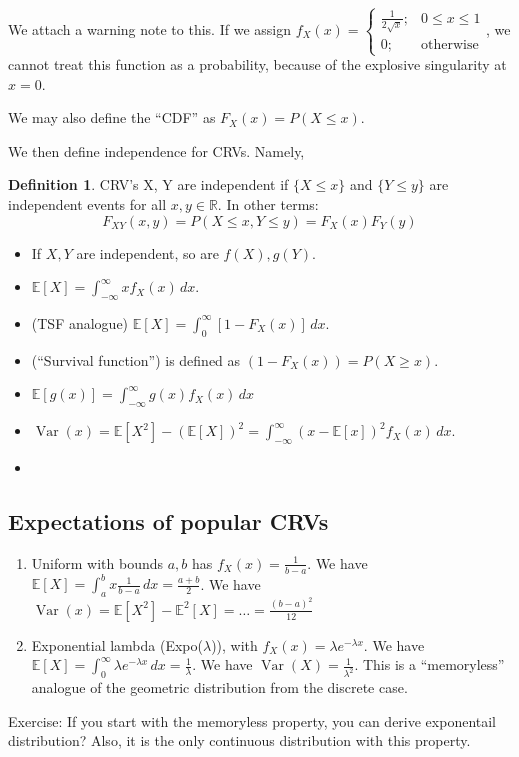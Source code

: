 \documentclass{article}
\newcommand{\R}{\mathbb R}
\newcommand{\E}{\mathbb E}
\DeclareMathOperator{\Var}{Var}
\theoremstyle{remark}
\theoremstyle{definition}
\newtheorem{definition}{Definition}[section]
\begin{document}
We attach a warning note to this.
If we assign $f_X(x) = \begin{cases}
    \frac{1}{2\sqrt x}; & 0\leq x \leq 1 \\
    0; &\text{otherwise}
\end{cases}$, 
we cannot treat this function as a probability, because of the explosive singularity at $x = 0$.

We may also define the ``CDF'' as $F_X(x) = P(X \leq x)$.

We then define independence for CRVs.
Namely,
\begin{definition}
    CRV's X, Y are independent if $\{X \leq x\}$ and $\{Y \leq y\}$ are independent events for all $x, y\in \R$.
    In other terms:
    \begin{equation*}
        F_{XY}(x, y) = P(X \leq x, Y \leq y) = F_X(x) F_Y(y) 
    \end{equation*}
\end{definition}
\begin{itemize}
    \item If $X,Y$ are independent, so are $f(X), g(Y)$.
    \item $\E[X] = \int_{-\infty}^{\infty} xf_X(x)\, dx$. 
    \item (TSF analogue) $\E[X] = \int_0^\infty[1 - F_X(x)]\, dx$.
    \item (``Survival function'') is defined as $(1 - F_X(x)) = P(X \geq x)$.
    \item $\E[g(x)] = \int_{-\infty}^\infty g(x) f_X(x) \, dx$ 
    \item $\Var(x) = \E[X^2] - (\E[X])^2 = \int_{-\infty}^\infty (x - \E[x])^2 f_X(x) \, dx$.
    \item %
\end{itemize}

\subsection*{Expectations of popular CRVs}
\begin{enumerate}
    \item Uniform with bounds $a, b$ has $f_X(x) = \frac{1}{b-a}$. 
    We have $\E[X] = \int_a^b x\frac{1}{b-a}\, dx = \frac{a+b}2$.
    We have $\Var(x) = \E[X^2] - \E^2[X] = \dots = \frac{(b-a)^2}{12}$
    \item Exponential lambda (Expo($\lambda$)), with $f_X(x) = \lambda e^{-\lambda x}$.
    We have $\E[X] = \int_0^\infty \lambda e^{-\lambda x} \, dx = \frac1\lambda$.
    We have $\Var(X) = \frac{1}{\lambda^2}$.
    This is a ``memoryless'' analogue of the geometric distribution from the discrete case.
\end{enumerate}

Exercise: If you start with the memoryless property, you can derive exponentail distribution?
Also, it is the only continuous distribution with this property. 
\end{document}
